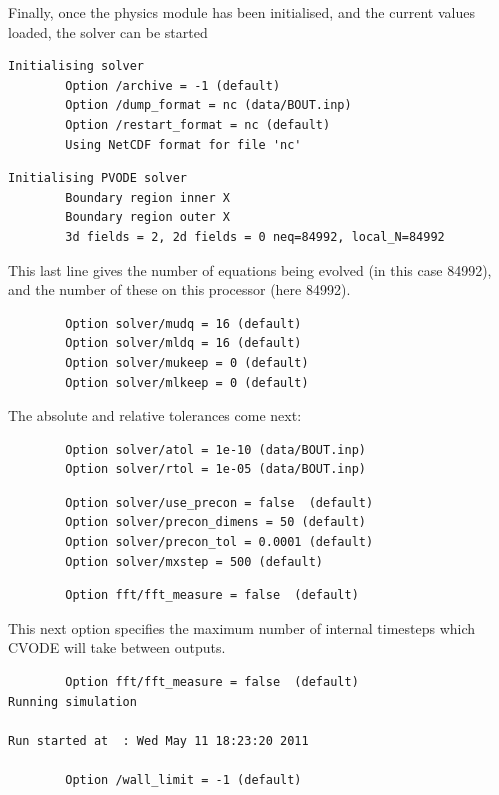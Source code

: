 \documentclass[12pt]{article}
\begin{document}
Finally, once the physics module has been initialised, and the current values
loaded, the solver can be started
%
\begin{verbatim}
Initialising solver
        Option /archive = -1 (default)
        Option /dump_format = nc (data/BOUT.inp)
        Option /restart_format = nc (default)
        Using NetCDF format for file 'nc'
\end{verbatim}
%
\begin{verbatim}
Initialising PVODE solver
        Boundary region inner X
        Boundary region outer X
        3d fields = 2, 2d fields = 0 neq=84992, local_N=84992
\end{verbatim}
%
This last line gives the number of equations being evolved (in this case
84992), and the number of these on this processor (here 84992).
%
\begin{verbatim}
        Option solver/mudq = 16 (default)
        Option solver/mldq = 16 (default)
        Option solver/mukeep = 0 (default)
        Option solver/mlkeep = 0 (default)
\end{verbatim}
%
The absolute and relative tolerances come next:
%
\begin{verbatim}
        Option solver/atol = 1e-10 (data/BOUT.inp)
        Option solver/rtol = 1e-05 (data/BOUT.inp)
\end{verbatim}
%
\begin{verbatim}
        Option solver/use_precon = false  (default)
        Option solver/precon_dimens = 50 (default)
        Option solver/precon_tol = 0.0001 (default)
        Option solver/mxstep = 500 (default)
\end{verbatim}
%
\begin{verbatim}
        Option fft/fft_measure = false  (default)
\end{verbatim}
%
This next option specifies the maximum number of internal timesteps which CVODE
will take between outputs.
%
\begin{verbatim}
        Option fft/fft_measure = false  (default)
Running simulation

Run started at  : Wed May 11 18:23:20 2011

        Option /wall_limit = -1 (default)
\end{verbatim}
%
\end{document}
